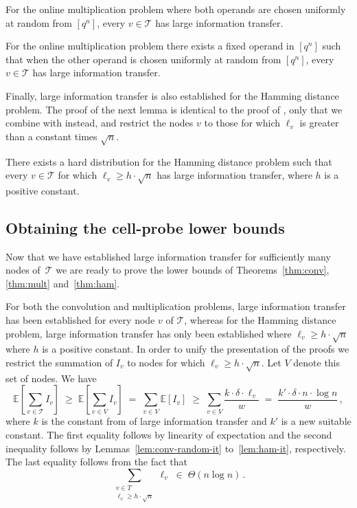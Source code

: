 \documentclass{toc}
\newcommand{\calT}{\ensuremath{\mathcal{T}}}
\newcommand{\lit}{large information transfer\xspace}
\newcommand{\vit}{\ensuremath{I_v}}
\begin{document}
\begin{lemma}
	\label{lem:mult-random-it}
	For the online multiplication problem where both operands are chosen uniformly at random from $[q^n]$, every $v\in\calT$ has \lit.
\end{lemma}

\begin{lemma}
	\label{lem:mult-it}
	For the online multiplication problem there exists a fixed operand in $[q^n]$ such that when the other operand is chosen uniformly at random from $[q^n]$, every $v\in\calT$ has \lit.
\end{lemma}

Finally, large information transfer is also established for the Hamming distance problem. The proof of the next lemma is identical to the proof of , only that we
combine  with  instead, and
restrict the nodes $v$ to those for which $\ell_v$ is greater than a constant times $\sqrt{n}$.

\begin{lemma}
	\label{lem:ham-it}
	There exists a hard distribution for the Hamming distance problem such that every $v\in\calT$ for which $\ell_v\geq h \cdot \sqrt{n}$ has \lit, where $h$ is a positive constant.
\end{lemma}


\subsection{Obtaining the cell-probe lower bounds}\label{sec:entropyconc}

Now that we have established \lit for sufficiently many nodes of~$\calT$ we are ready to prove the lower bounds of Theorems~\ref{thm:conv}, \ref{thm:mult} and~\ref{thm:ham}.

For both the convolution and multiplication problems, \lit has been established for every node $v$ of $\calT$, whereas for the Hamming distance problem, \lit has only been established where $\ell_v\geq h \cdot \sqrt{n}$ where $h$ is a positive constant.
In order to unify the presentation of the proofs we restrict the summation of $\vit$ to nodes for which $\ell_v\geq h \cdot \sqrt{n}$.
Let $V$ denote this set of nodes.
We have
\begin{equation}
\label{eq:total-it}
\mathbb{E}\left[\sum_{v\in\calT} \vit\right]
\;\geq\;
\mathbb{E}\left[\sum_{v\in V} \vit\right]
\;=\;
\sum_{v\in V} \mathbb{E}[\vit]
\;\geq\;
\sum_{v\in V} \frac{k\cdot\delta\cdot\ell_v}{w}
\;=\;
\frac{k'\cdot\delta\cdot n\cdot \log n}{w}\,,
\end{equation}
where $k$ is the constant from  of \lit and $k'$ is a new suitable constant.
The first equality follows by linearity of expectation and the second inequality follows by Lemmas~\ref{lem:conv-random-it} to~\ref{lem:ham-it}, respectively.
The last equality follows from the fact that
\[
\sum_{\substack{v\in T\\ \ell_v \geqslant h \cdot \sqrt{n}}} \ell_v \;\in\; \Theta(n\log n)\,.
\]
\end{document}
